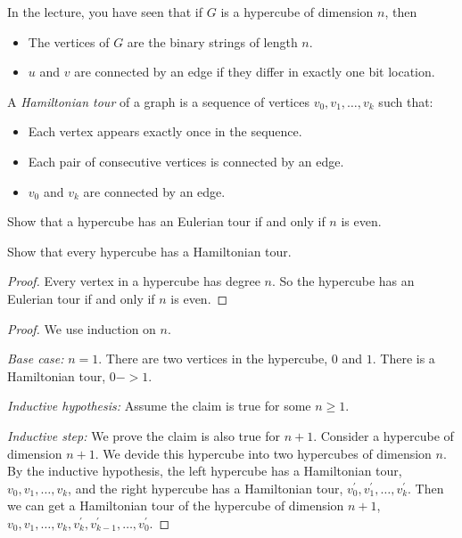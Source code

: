 \documentclass[11pt]{article}
\begin{document}

In the lecture, you have seen that if $G$ is a hypercube of dimension $n$, then
\begin{itemize}
    \item The vertices of $G$ are the binary strings of length $n$.
    \item $u$ and $v$ are connected by an edge if they differ in exactly one bit location.
\end{itemize}

A \emph{Hamiltonian tour} of a graph is a sequence of vertices
$v_0, v_1, \ldots, v_k$ such that:
\begin{itemize}
    \item Each vertex appears exactly once in the sequence.
    \item Each pair of consecutive vertices is connected by an edge.
    \item $v_0$ and $v_k$ are connected by an edge.
\end{itemize}

\begin{Parts}

    \Part Show that a hypercube has an Eulerian tour if and only if $n$ is even.
    

    \Part Show that every hypercube has a Hamiltonian tour. 

    

\end{Parts}

\begin{solution}
\begin{Parts}
    \Part
    \begin{proof}
        Every vertex in a hypercube has degree $n$. So the hypercube has an Eulerian tour if and only if $n$ is even.
    \end{proof}
    \Part
    \begin{proof}
        We use induction on $n$.
        
        \emph{Base case:} $n = 1$. There are two vertices in the hypercube, $0$ and $1$. There is a Hamiltonian tour, $0->1$.
        
        \emph{Inductive hypothesis:} Assume the claim is true for some $n \ge 1$.
        
        \emph{Inductive step:} We prove the claim is also true for $n+1$. 
        Consider a hypercube of dimension $n+1$. We devide this hypercube into two hypercubes of dimension $n$. 
        By the inductive hypothesis, the left hypercube has a Hamiltonian tour, $v_0, v_1, \ldots, v_k$, 
        and the right hypercube has a Hamiltonian tour, $v^{'}_0, v^{'}_1, \ldots, v^{'}_k$.
        Then we can get a Hamiltonian tour of the hypercube of dimension $n+1$, $v_0, v_1, \ldots, v_k, v^{'}_k, v^{'}_{k-1}, \ldots, v^{'}_0$.
    \end{proof}
\end{Parts}
\end{solution}
\end{document}
